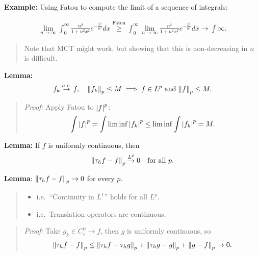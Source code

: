 \textbf{Example:} Using Fatou to compute the limit of a sequence of
integrals:

\begin{align*}
\lim _{n \rightarrow \infty} \int_{0}^{\infty} \frac{n^{2}}{1+n^{2} x^{2}} e^{-\frac{x^{2}}{n^{3}}} d x
\overset{\text{Fatou}}\geq
\int_{0}^{\infty} \lim _{n \rightarrow \infty}  \frac{n^{2}}{1+n^{2} x^{2}} e^{-\frac{x^{2}}{n^{3}}} d x \to \int \infty
.\end{align*}

\begin{quote}
Note that MCT might work, but showing that this is non-decreasing in
\(n\) is difficult.
\end{quote}

\textbf{Lemma:} \begin{align*}
f_k \overset{a.e.}\to f ,\quad
{\left\lVert {f_k} \right\rVert}_p \leq M
\implies f\in L^p \text{ and } {\left\lVert {f} \right\rVert}_p \leq M
.\end{align*}

\begin{quote}
\emph{Proof:} Apply Fatou to \({\left\lvert {f} \right\rvert}^p\): \begin{align*}
\int {\left\lvert {f} \right\rvert}^p = \int \liminf {\left\lvert {f_k} \right\rvert}^p \leq \liminf \int {\left\lvert {f_k} \right\rvert}^p = M
.\end{align*}
\end{quote}

\textbf{Lemma:} If \(f\) is uniformly continuous, then \begin{align*}
{\left\lVert {\tau_h f - f} \right\rVert}_p \overset{L^p}\to 0 \quad \text{for all } p
.\end{align*}

\textbf{Lemma}: \({\left\lVert {\tau_h f - f} \right\rVert}_p \to 0\) for every \(p\).

\begin{quote}
\begin{itemize}
\tightlist
\item
  i.e.~``Continuity in \(L^1\)'' holds for all \(L^p\).
\item
  i.e.~Translation operators are continuous.
\end{itemize}
\end{quote}

\begin{quote}
\emph{Proof:} Take \(g_k \in C_c^0 \to f\), then \(g\) is uniformly
continuous, so \begin{align*}
{\left\lVert {\tau_h f - f} \right\rVert}_p
\leq {\left\lVert {\tau_h f - \tau_h g} \right\rVert}_p + {\left\lVert {\tau_h g - g} \right\rVert}_p + {\left\lVert {g - f} \right\rVert}_p \to 0
.\end{align*}
\end{quote}

